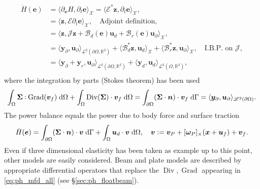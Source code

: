 \documentclass{svjour3}                     %
\newcommand{\secref}[1]{\S\ref{#1}}
\DeclareMathOperator*{\Grad}{Grad}
\DeclareMathOperator*{\Div}{Div}
\newcommand{\crmat}[1]{\ensuremath{[#1]_{\times}}}
\def\onedot{$\mathsurround0pt\ldotp$}
\def\cddot{%
	\mathbin{\vcenter{\baselineskip.67ex
			\hbox{\onedot}\hbox{\onedot}}%
}}
\begin{document}
\begin{equation}
\begin{aligned}
\dot{H}(\bm{e}) &= \langle \partial_{\bm{e}} H, \partial_t {\bm{e}} \rangle_{\mathscr{X}} = \langle \bm{\mathcal{E}}^* \bm{z}, \partial_t {\bm{e}} \rangle_{\mathscr{X}}, \\
&= \langle \bm{z}, \bm{\mathcal{E}} \partial_t {\bm{e}} \rangle_{\mathscr{X}}, \quad \text{Adjoint definition}, \\
& = \langle \bm{z}, \bm{\mathcal{J}}\bm{z} + \bm{\mathcal{B}}_d(\bm{e}) \bm{u}_d + \bm{\mathcal{B}}_r(\bm{e}) \bm{u}_\partial \rangle_{\mathscr{X}}, \\
& = \langle \bm{y}_\partial,  \bm{u}_\partial \rangle_{\mathscr{L}^2(\partial\Omega, \mathbb{R}^3)} + \langle \bm{\mathcal{B}}_d^* \bm{z}, \bm{u}_d \rangle_{\mathscr{X}} + \langle \bm{\mathcal{B}}_r^* \bm{z}, \bm{u}_\partial \rangle_{\mathscr{X}}, \quad \text{I.B.P. on } \bm{\mathcal{J}}, \\
&= \langle \bm{y}_\partial + \bm{y}_r,  \bm{u}_\partial \rangle_{\mathscr{L}^2(\partial\Omega, \mathbb{R}^3)} + \langle \bm{y}_d,  \bm{u}_d \rangle_{\mathscr{L}^2(\Omega, \mathbb{R}^3)}, \\
\end{aligned}
\end{equation}
where the integration by parts (Stokes theorem) has been used
\begin{equation}
\label{eq:stokes}
\int_{\Omega} \bm\Sigma \cddot \Grad(\bm{v}_f) \d{\Omega} + \int_{\Omega} \Div(\bm\Sigma) \cdot \bm{v}_f \d{\Omega} = \int_{\partial \Omega} (\bm\Sigma \cdot \bm{n}) \cdot \bm{v}_f \d{\Gamma} = \langle \bm{y}_\partial,  \bm{u}_\partial \rangle_{\mathscr{L}^2(\partial\Omega)}.
\end{equation}
The power balance equals the power due to body force and surface traction
\begin{equation}
\dot{H}(\bm{e}) = \int_{\partial \Omega} (\bm{\Sigma} \cdot \bm{n}) \cdot \bm{v} \d\Gamma + \int_{\Omega} \bm{u}_d \cdot \bm{v}  \d{\Omega}, \quad \bm{v} := \bm{v}_P + \crmat{\bm{\omega}_P} (\bm{x}+\bm{u}_f) + {\bm{v}}_f.
\end{equation}
Even if three dimensional elasticity has been taken as example up to this point, other models are easily considered. Beam and plate models \cite{BRUGNOLI2019940,BRUGNOLI2019961} are described by appropriate differential operators that replace the $\Div, \Grad$ appearing in \eqref{eq:ph_mfd_all} (see \secref{sec:ph_floatbeam}).
\end{document}
